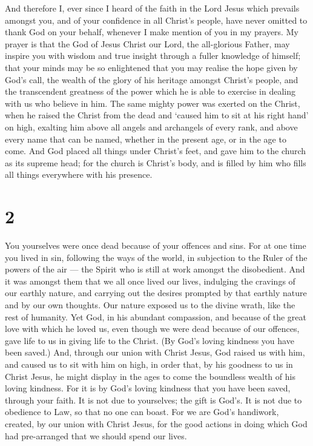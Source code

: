  And therefore I, ever since I heard of the faith in the
Lord Jesus which prevails amongst you, and of your confidence in all
Christ's people,  have never omitted to thank God on your
behalf, whenever I make mention of you in my prayers.  My
prayer is that the God of Jesus Christ our Lord, the all-glorious
Father, may inspire you with wisdom and true insight through a fuller
knowledge of himself;  that your minds may be so
enlightened that you may realise the hope given by God's call, the
wealth of the glory of his heritage amongst Christ's people,
 and the transcendent greatness of the power which he is
able to exercise in dealing with us who believe in him. 
The same mighty power was exerted on the Christ, when he raised the
Christ from the dead and `caused him to sit at his right hand' on high,
exalting him above all angels and archangels of every rank,
 and above every name that can be named, whether in the
present age, or in the age to come.  And God placed all
things under Christ's feet, and gave him to the church as its supreme
head;  for the church is Christ's body, and is filled by
him who fills all things everywhere with his presence.

\hypertarget{section-1}{%
\section{2}\label{section-1}}

 You yourselves were once dead because of your offences and
sins.  For at one time you lived in sin, following the ways
of the world, in subjection to the Ruler of the powers of the air ---
the Spirit who is still at work amongst the disobedient. 
And it was amongst them that we all once lived our lives, indulging the
cravings of our earthly nature, and carrying out the desires prompted by
that earthly nature and by our own thoughts. Our nature exposed us to
the divine wrath, like the rest of humanity.  Yet God, in
his abundant compassion, and because of the great love with which he
loved us,  even though we were dead because of our offences,
gave life to us in giving life to the Christ. (By God's loving kindness
you have been saved.)  And, through our union with Christ
Jesus, God raised us with him, and caused us to sit with him on high,
 in order that, by his goodness to us in Christ Jesus, he
might display in the ages to come the boundless wealth of his loving
kindness.  For it is by God's loving kindness that you have
been saved, through your faith. It is not due to yourselves; the gift is
God's.  It is not due to obedience to Law, so that no one
can boast.  For we are God's handiwork, created, by our
union with Christ Jesus, for the good actions in doing which God had
pre-arranged that we should spend our lives.

